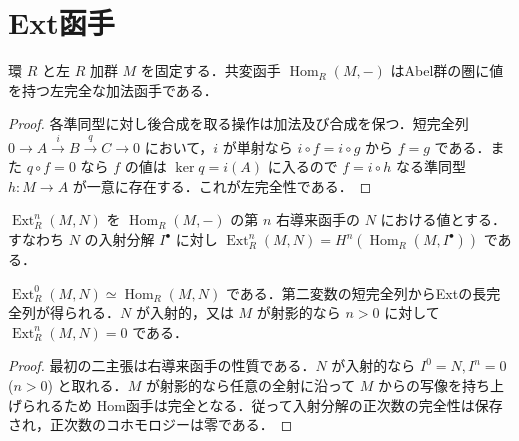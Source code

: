 \section{Ext函手}
\begin{prop}[Hom函手の左完全性]
環 $R$ と左 $R$ 加群 $M$ を固定する．共変函手 $\operatorname{Hom}_R(M,-)$ はAbel群の圏に値を持つ左完全な加法函手である．
\end{prop}
\begin{proof}
各準同型に対し後合成を取る操作は加法及び合成を保つ．短完全列 $0\to A\xrightarrow{i}B\xrightarrow{q}C\to0$ において，$i$ が単射なら $i\circ f=i\circ g$ から $f=g$ である．また $q\circ f=0$ なら $f$ の値は $\ker q=i(A)$ に入るので $f=i\circ h$ なる準同型 $h:M\to A$ が一意に存在する．これが左完全性である．
\end{proof}
\begin{defn}[Ext函手]
$\operatorname{Ext}_R^n(M,N)$ を $\operatorname{Hom}_R(M,-)$ の第 $n$ 右導来函手の $N$ における値とする．すなわち $N$ の入射分解 $I^\bullet$ に対し $\operatorname{Ext}_R^n(M,N)=H^n(\operatorname{Hom}_R(M,I^\bullet))$ である．
\end{defn}
\begin{prop}[Extの基本性質]
$\operatorname{Ext}_R^0(M,N)\simeq\operatorname{Hom}_R(M,N)$ である．第二変数の短完全列からExtの長完全列が得られる．$N$ が入射的，又は $M$ が射影的なら $n>0$ に対して $\operatorname{Ext}_R^n(M,N)=0$ である．
\end{prop}
\begin{proof}
最初の二主張は右導来函手の性質である．$N$ が入射的なら $I^0=N,I^n=0$ ($n>0$) と取れる．$M$ が射影的なら任意の全射に沿って $M$ からの写像を持ち上げられるため Hom函手は完全となる．従って入射分解の正次数の完全性は保存され，正次数のコホモロジーは零である．
\end{proof}
